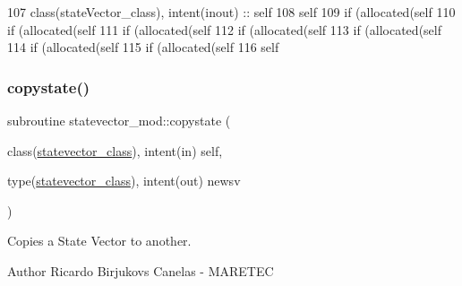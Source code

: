 \begin{DoxyCode}
107     \textcolor{keywordtype}{class}(stateVector\_class), \textcolor{keywordtype}{intent(inout)} :: self
108     self%
109     \textcolor{keywordflow}{if} (\textcolor{keyword}{allocated}(self%
110     \textcolor{keywordflow}{if} (\textcolor{keyword}{allocated}(self%
111     \textcolor{keywordflow}{if} (\textcolor{keyword}{allocated}(self%
112     \textcolor{keywordflow}{if} (\textcolor{keyword}{allocated}(self%
113     \textcolor{keywordflow}{if} (\textcolor{keyword}{allocated}(self%
114     \textcolor{keywordflow}{if} (\textcolor{keyword}{allocated}(self%
115     \textcolor{keywordflow}{if} (\textcolor{keyword}{allocated}(self%
116     self%
\end{DoxyCode}
\mbox{\label{namespacestatevector__mod_afb7f6650aedee27644d33416d3a49fc0}} 
\subsubsection{\texorpdfstring{copystate()}{copystate()}}
{\footnotesize\ttfamily subroutine statevector\+\_\+mod\+::copystate (\begin{DoxyParamCaption}\item[{class(\mbox{\hyperlink{structstatevector__mod_1_1statevector__class}{statevector\+\_\+class}}), intent(in)}]{self,  }\item[{type(\mbox{\hyperlink{structstatevector__mod_1_1statevector__class}{statevector\+\_\+class}}), intent(out)}]{newsv }\end{DoxyParamCaption})\hspace{0.3cm}{\ttfamily [private]}}



Copies a State Vector to another. 

\begin{DoxyAuthor}{Author}
Ricardo Birjukovs Canelas -\/ M\+A\+R\+E\+T\+EC 
\end{DoxyAuthor}


